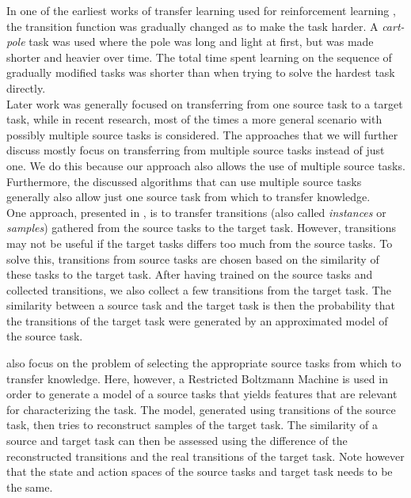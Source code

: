 In one of the earliest works of transfer learning used for reinforcement learning \parencite{conf/ijcai/SelfridgeSB85}, the transition function was gradually changed as to make the task harder.
A \emph{cart-pole} task was used where the pole was long and light at first, but was made shorter and heavier over time.
The total time spent learning on the sequence of gradually modified tasks was shorter than when trying to solve the hardest task directly.\\

Later work was generally focused on transferring from one source task to a target task, while in recent research, most of the times a more general scenario with possibly multiple source tasks is considered.
The approaches that we will further discuss mostly focus on transferring from multiple source tasks instead of just one.
We do this because our approach also allows the use of multiple source tasks.
Furthermore, the  discussed algorithms that can use multiple source tasks generally also allow just one source task from which to transfer knowledge.\\

One approach, presented in \cite{lazaric2008transfer}, is to transfer transitions (also called \textit{instances} or \textit{samples}) gathered from the source tasks to the target task.
However, transitions may not be useful if the target tasks differs too much from the source tasks.
To solve this, transitions from source tasks are chosen based on the similarity of these tasks to the target task.
After having trained on the source tasks and collected transitions, we also collect a few transitions from the target task.
The similarity between a source task and the target task is then the probability that the transitions of the target task were generated by an approximated model of the source task.

\cite{Ammar2014} also focus on the problem of selecting the appropriate source tasks from which to transfer knowledge.
Here, however, a Restricted Boltzmann Machine \parencite{Smolensky1986} is used in order to generate a model of a source tasks that yields features that are relevant for characterizing the task.
The model, generated using transitions of the source task, then tries to reconstruct samples of the target task.
The similarity of a source and target task can then be assessed using the difference of the reconstructed transitions and the real transitions of the target task.
Note however that the state and action spaces of the source tasks and target task needs to be the same.\\

